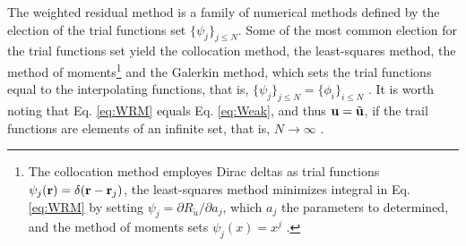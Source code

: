         The weighted residual method is a family of numerical methods defined by the election of the trial functions set $\{\psi_j\}_{j\leq N}$. Some of the most common election for the trial functions set yield the collocation method, the least-squares method, the method of moments\footnote{The collocation method employes Dirac deltas as trial functions $\psi_j(\vb{r}) = \delta(\vb{r} - \vb{r}_j)$, the least-squares method minimizes integral in Eq. \eqref{eq:WRM} by setting $\psi_j = \partial R_{\tilde{u}}/\partial a_j$, which $a_j$ the parameters to determined, and the method of moments  sets $\psi_j(x) = x^j$ \cite{fletcher_computational_1984}. } and the Galerkin method, which sets the trial functions equal to the interpolating functions, that is, $\{\psi_j\}_{j\leq N} = \{\phi_i\}_{i\leq N}$ \cite{fletcher_computational_1984}.  It is worth noting that Eq. \eqref{eq:WRM} equals Eq. \eqref{eq:Weak}, and thus $\vb{u} = \tilde{\vb{u}}$, if the trail functions are elements of an infinite set, that is, $N \to \infty$ \cite{dhatt_finite_2012}.

